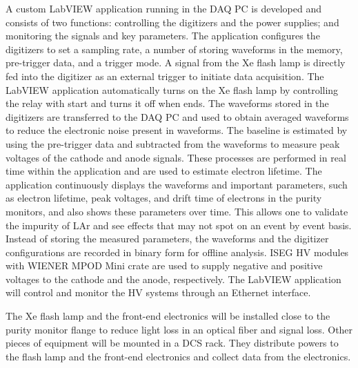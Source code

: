 A custom LabVIEW application running in the DAQ PC is developed and consists of two functions: controlling the digitizers and the power supplies; and monitoring the signals and key parameters. The application configures the digitizers to set a sampling rate, a number of storing waveforms in the memory, pre-trigger data, and a trigger mode. A signal from the Xe flash lamp is directly fed into the digitizer as an external trigger to initiate data acquisition. The LabVIEW application automatically turns on the Xe flash lamp by controlling the relay with start and turns it off when ends. The waveforms stored in the digitizers are transferred to the DAQ PC and used to obtain averaged waveforms to reduce the electronic noise present in waveforms. The baseline is estimated by using the pre-trigger data and subtracted from the waveforms to measure peak voltages of the cathode and anode signals. These processes are performed in real time within the application and are used to estimate electron lifetime. The application continuously displays the waveforms and important parameters, such as electron lifetime, peak voltages, and drift time of electrons in the purity monitors, and also shows these parameters over time. This allows one to validate the impurity of LAr and see effects that may not spot on an event by event basis. Instead of storing the measured parameters, the waveforms and the digitizer configurations are recorded in binary form for offline analysis. ISEG HV modules with WIENER MPOD Mini crate are used to supply negative and positive voltages to the cathode and the anode, respectively. The LabVIEW application will control and monitor the HV systems through an Ethernet interface.  

The Xe flash lamp and the front-end electronics will be installed close to the purity monitor flange to reduce light loss in an optical fiber and signal loss. Other pieces of equipment will be mounted in a DCS rack. They distribute powers to the flash lamp and the front-end electronics and collect data from the electronics.

